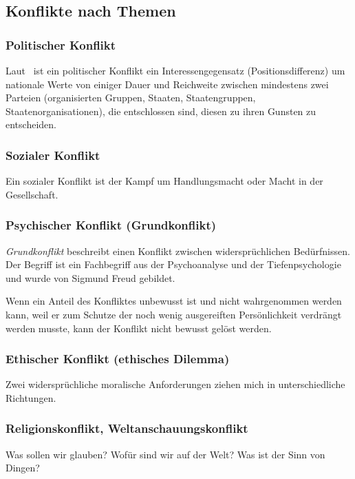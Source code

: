 \subsection{Konflikte nach Themen}

\subsubsection{Politischer Konflikt}

Laut~\cite{konfliktbarometer-2003} ist ein politischer Konflikt ein \glqq Interessengegensatz (Positionsdifferenz) um nationale Werte von einiger Dauer und Reichweite zwischen mindestens zwei Parteien (organisierten Gruppen, Staaten, Staatengruppen, Staatenorganisationen), die entschlossen sind, diesen zu ihren Gunsten zu entscheiden.\grqq

\subsubsection{Sozialer Konflikt}

Ein sozialer Konflikt ist der Kampf um Handlungsmacht oder Macht in der Gesellschaft.

\subsubsection{Psychischer Konflikt (Grundkonflikt)}

\emph{Grundkonflikt} beschreibt einen Konflikt zwischen widersprüchlichen Bedürfnissen. Der Begriff ist ein Fachbegriff aus der Psychoanalyse und der Tiefenpsychologie und wurde von Sigmund Freud gebildet.

Wenn ein Anteil des Konfliktes unbewusst ist und nicht wahrgenommen werden kann, weil er zum Schutze der noch wenig ausgereiften Persönlichkeit verdrängt werden musste, kann der Konflikt nicht bewusst gelöst werden.

\subsubsection{Ethischer Konflikt (ethisches Dilemma)}

Zwei widersprüchliche moralische Anforderungen ziehen mich in unterschiedliche Richtungen.

\subsubsection{Religionskonflikt, Weltanschauungskonflikt}

Was sollen wir glauben? Wofür sind wir auf der Welt? Was ist der Sinn von Dingen?
